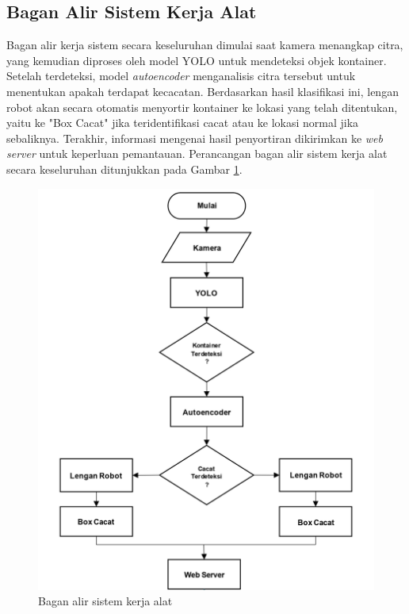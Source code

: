 \vspace{1em}

\subsection{Bagan Alir Sistem Kerja Alat}
Bagan alir kerja sistem secara keseluruhan dimulai saat kamera
menangkap citra, yang
kemudian diproses oleh model YOLO untuk mendeteksi objek kontainer.
Setelah terdeteksi, model \textit{autoencoder} menganalisis citra tersebut
untuk menentukan apakah terdapat kecacatan. Berdasarkan hasil
klasifikasi ini, lengan robot akan secara otomatis menyortir
kontainer ke lokasi yang telah ditentukan, yaitu ke "Box Cacat" jika
teridentifikasi cacat atau ke lokasi normal jika sebaliknya.
Terakhir, informasi mengenai hasil penyortiran dikirimkan ke \textit{web
server} untuk keperluan pemantauan. Perancangan bagan alir sistem kerja
alat secara keseluruhan ditunjukkan pada Gambar \ref{fig:bagan-alir-kerja}.

\begin{figure}[H]
  \centering
  \includegraphics[]{gambar/flowchart.jpg}
  \caption{Bagan alir sistem kerja alat}
  \label{fig:bagan-alir-kerja}
\end{figure}
\vspace{-1em}
